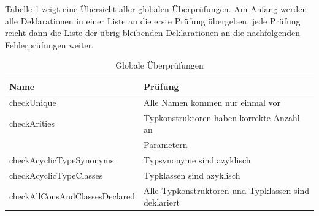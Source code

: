 %
%
%
%

Tabelle \ref{tab:global-checks} zeigt eine Übersicht aller globalen Überprüfungen. Am Anfang werden alle Deklarationen in einer
Liste an die erste Prüfung übergeben, jede Prüfung reicht dann die Liste der übrig bleibenden Deklarationen an die nachfolgenden
Fehlerprüfungen weiter.

\begin{table}[th]
\centering
\begin{tabular}{| l | l |}
\hline
Name&Prüfung\\
\hline
  checkUnique&Alle Namen kommen nur einmal vor\\
  checkArities&Typkonstruktoren haben korrekte Anzahl an\\
  &  Parametern\\
  checkAcyclicTypeSynonyms&Typsynonyme sind azyklisch\\
  checkAcyclicTypeClasses&Typklassen sind azyklisch\\
  checkAllConsAndClassesDeclared&Alle Typkonstruktoren und Typklassen sind deklariert\\
\hline
\end{tabular}
\caption{Globale Überprüfungen}
\label{tab:global-checks}
\end{table}

